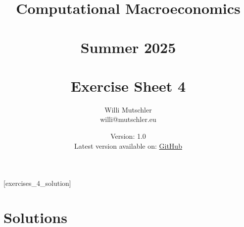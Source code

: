 
\newif\ifDisplaySolutions\DisplaySolutionstrue%


\title{Computational Macroeconomics\\~\\Summer 2025\\~\\Exercise Sheet 4}
\author{Willi Mutschler\\willi@mutschler.eu}
\date{Version: 1.0\\Latest version available on: \href{https://github.com/wmutschl/Computational-Macroeconomics/releases/latest/download/exercises_4.pdf}{GitHub}}
\maketitle\thispagestyle{empty}

\newpage
{}[exercises_4_solution]
\tableofcontents\thispagestyle{empty}\newpage

\setcounter{page}{1}
\newpage
\newpage
\printbibliography%
\newpage

\ifDisplaySolutions%
\newpage
\appendix
\section{Solutions}

\fi
